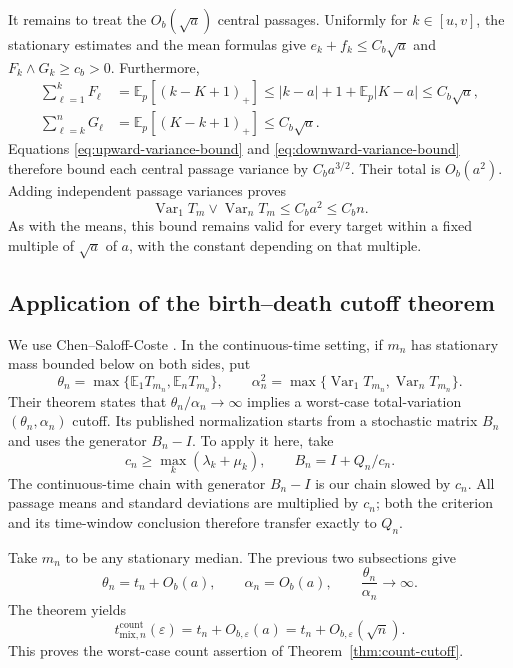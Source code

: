 It remains to treat the $O_b(\sqrt a)$ central passages. Uniformly for
$k\in[u,v]$, the stationary estimates and the mean formulas give
$e_k+f_k\leq C_b\sqrt a$ and $F_k\wedge G_k\geq c_b>0$.
Furthermore,
\begin{align*}
 \sum_{\ell=1}^{k}F_\ell
 &=\mathbb E_p[(k-K+1)_+]\leq|k-a|+1+\mathbb E_p|K-a|
   \leq C_b\sqrt a,\\
 \sum_{\ell=k}^{n}G_\ell
 &=\mathbb E_p[(K-k+1)_+]\leq C_b\sqrt a.
\end{align*}
Equations \eqref{eq:upward-variance-bound} and
\eqref{eq:downward-variance-bound} therefore bound each central passage
variance by $C_ba^{3/2}$. Their total is $O_b(a^2)$.
Adding independent passage variances proves
\[
 \boxed{\quad
 \operatorname{Var}_1T_m\vee\operatorname{Var}_nT_m
 \leq C_ba^2\leq C_bn.
 \quad}
\]
As with the means, this bound remains valid for every target within a
fixed multiple of $\sqrt a$ of $a$, with the constant depending on that
multiple.


\subsection{Application of the birth--death cutoff theorem}
We use Chen--Saloff-Coste \cite[Theorem~1.4(1)]{CSC2015}.
In the continuous-time setting, if $m_n$ has
stationary mass bounded below on both sides, put
\[
 \theta_n=\max\{\mathbb E_1T_{m_n},\mathbb E_nT_{m_n}\},\qquad
 \alpha_n^2=\max\{\operatorname{Var}_1T_{m_n},
                         \operatorname{Var}_nT_{m_n}\}.
\]
Their theorem states that $\theta_n/\alpha_n\to\infty$ implies a
worst-case total-variation $(\theta_n,\alpha_n)$ cutoff. Its published
normalization starts from a stochastic matrix $B_n$ and uses the generator
$B_n-I$. To apply it here, take
\[
 c_n\geq\max_k(\lambda_k+\mu_k),\qquad B_n=I+Q_n/c_n.
\]
The continuous-time chain with generator $B_n-I$ is our chain slowed by
$c_n$. All passage means and standard deviations are multiplied by $c_n$;
both the criterion and its time-window conclusion therefore transfer
exactly to $Q_n$.

Take $m_n$ to be any stationary median. The previous two subsections give
\[
 \theta_n=t_n+O_b(a),\qquad \alpha_n=O_b(a),\qquad
 \frac{\theta_n}{\alpha_n}\longrightarrow\infty.
\]
The theorem yields
\[
 t^{\mathrm{count}}_{\mathrm{mix},n}(\varepsilon)
 =t_n+O_{b,\varepsilon}(a)
 =t_n+O_{b,\varepsilon}(\sqrt n).
\]
This proves the worst-case count assertion of
Theorem~\ref{thm:count-cutoff}.

